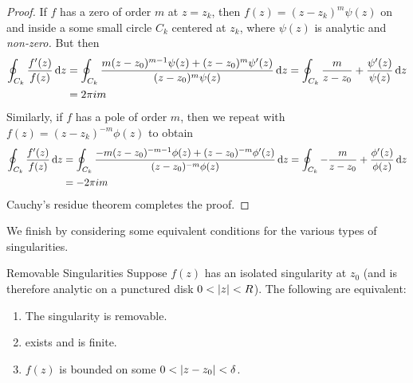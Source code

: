 \begin{proof}
If $f$ has a zero of order $m$ at $z=z_k$, then $f(z)=(z-z_k)^m\psi(z)$ on and inside a some small circle $C_k$ centered at $z_k$, where $\psi(z)$ is analytic and \emph{non-zero.} But then
\begin{align*}
\oint_{C_k}\frac{f'(z)}{f(z)}\,{\mathrm{d} z}&=\oint_{C_k}\frac{m(z-z_0)^{m-1}\psi(z)+(z-z_0)^m\psi'(z)}{(z-z_0)^m\psi(z)} \,{\mathrm{d} z}= \oint_{C_k}\frac m{z-z_0}+\frac{\psi'(z)}{\psi(z)} \,{\mathrm{d} z}\\
&=2\pi im
\end{align*}
Similarly, if $f$ has a pole of order $m$, then we repeat with $f(z)=(z-z_k)^{-m}\phi(z)$ to obtain
\begin{align*}
\oint_{C_k}\frac{f'(z)}{f(z)}\,{\mathrm{d} z}&=\oint_{C_k}\frac{-m(z-z_0)^{-m-1}\phi(z)+(z-z_0)^{-m}\phi'(z)}{(z-z_0)^{-m}\phi(z)} \,{\mathrm{d} z}= \oint_{C_k}-\frac m{z-z_0}+\frac{\phi'(z)}{\phi(z)} \,{\mathrm{d} z}\\
&=-2\pi im
\end{align*}
Cauchy's residue theorem completes the proof.
\end{proof}


We finish by considering some equivalent conditions for the various types of singularities.

\begin{thm}{Removable Singularities}{}
Suppose $f(z)$ has an isolated singularity at $z_0$ (and is therefore analytic on a punctured disk $0<\left| z\right|<R$). The following are equivalent:
\begin{enumerate}
	\item The singularity is removable.
	\item {} exists and is finite.
	\item $f(z)$ is bounded on some $0<\left| z-z_0\right|<\delta$.
\end{enumerate}
\end{thm}

